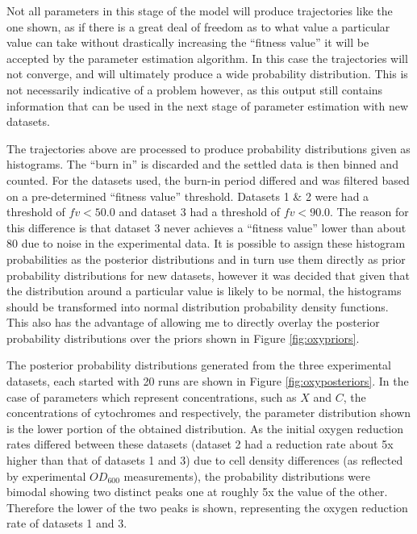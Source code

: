 Not all parameters in this stage of the model will produce trajectories like the one shown, as if there is a great deal of freedom as to what value a particular value can take without drastically increasing the ``fitness value'' it will be accepted by the parameter estimation algorithm. In this case the trajectories will not converge, and will ultimately produce a wide probability distribution. This is not necessarily indicative of a problem however, as this output still contains information that can be used in the next stage of parameter estimation with new datasets.

The trajectories above are processed to produce probability distributions given as histograms. The ``burn in'' is discarded and the settled data is then binned and counted. For the datasets used, the burn-in period differed and was filtered based on a pre-determined ``fitness value'' threshold. Datasets 1 \& 2 were had a threshold of $fv < 50.0$ and dataset 3 had a threshold of $fv < 90.0$. The reason for this difference is that dataset 3 never achieves a ``fitness value'' lower than about 80 due to noise in the experimental data. It is possible to assign these histogram probabilities as the posterior distributions and in turn use them directly as prior probability distributions for new datasets, however it was decided that given that the distribution around a particular value is likely to be normal, the histograms should be transformed into normal distribution probability density functions. This also has the advantage of allowing me to directly overlay the posterior probability distributions over the priors shown in Figure \ref{fig:oxypriors}.

The posterior probability distributions generated from the three experimental datasets, each started with 20 runs are shown in Figure \ref{fig:oxyposteriors}. In the case of parameters which represent concentrations, such as $X$ and $C$, the concentrations of cytochromes and \cbbthree{} respectively, the parameter distribution shown is the lower portion of the obtained distribution. As the initial oxygen reduction rates differed between these datasets (dataset 2 had a reduction rate about 5x higher than that of datasets 1 and 3) due to cell density differences (as reflected by experimental $OD_{600}$ measurements), the probability distributions were bimodal showing two distinct peaks one at roughly 5x the value of the other. Therefore the lower of the two peaks is shown, representing the oxygen reduction rate of datasets 1 and 3.

